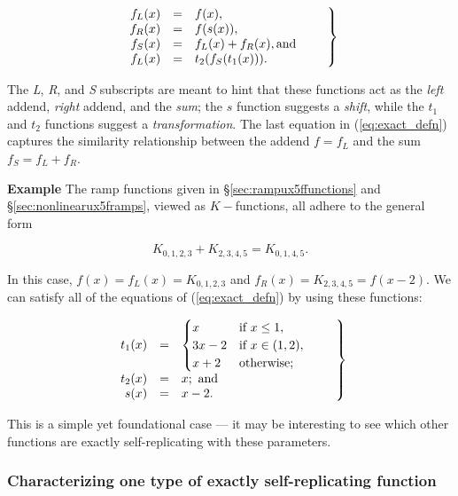 \documentclass[20pt,]{extarticle}
\begin{document}
\begin{equation}\left.\mbox{$\begin{array}{rcl}
  f_L(x) & = & f(x), \\
  f_R(x) & = & f(s(x)), \\
  f_S(x) & = & f_L(x) + f_R(x), \text{and} \\
  f_L(x) & = & t_2(f_S(t_1(x))).
\end{array}$}\quad\quad\right\rbrace\label{eq:exact_defn}\end{equation}

The \emph{L}, \emph{R}, and \emph{S} subscripts are meant to hint that
these functions act as the \emph{left} addend, \emph{right} addend, and
the \emph{sum}; the \(s\) function suggests a \emph{shift}, while the
\(t_1\) and \(t_2\) functions suggest a \emph{transformation}. The last
equation in (\ref{eq:exact_defn}) captures the similarity relationship
between the addend \(f = f_L\) and the sum \(f_S = f_L + f_R\).

\textbf{Example} The ramp functions given in
§\ref{sec:rampux5ffunctions} and §\ref{sec:nonlinearux5framps}, viewed
as \(K-\)functions, all adhere to the general form

\[K_{0,1,2,3} + K_{2,3,4,5} = K_{0,1,4,5}.\]

In this case, \(f(x) = f_L(x) = K_{0,1,2,3}\) and
\(f_R(x) = K_{2,3,4,5} = f(x-2)\). We can satisfy all of the equations
of (\ref{eq:exact_defn}) by using these functions:

\begin{equation}\left.\mbox{$\begin{array}{rcl}
t_1(x) & = &
\begin{cases}
  x              &   \text{if } x \le 1,       \\
  3x - 2         &   \text{if } x \in (1,2),   \\
  x + 2          &   \text{otherwise;}         \\
\end{cases}\\
t_2(x) & = & x; \text{ and} \\
s(x)   & = & x - 2. \\
\end{array}$}\quad\quad\right\rbrace\label{eq:s_t1_t2}\end{equation}

This is a simple yet foundational case --- it may be interesting to see
which other functions are exactly self-replicating with these
parameters.

\subsubsection{Characterizing one type of exactly self-replicating
function}\label{characterizing-one-type-of-exactly-self-replicating-function}
\end{document}
